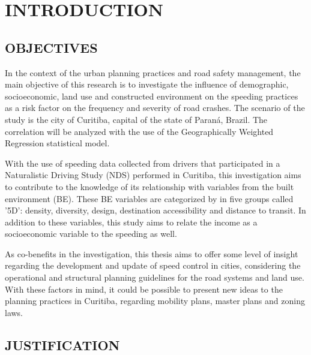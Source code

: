 

\chapter[INTRODUCTION]{INTRODUCTION}




\section{OBJECTIVES}

In the context of the urban planning practices and road safety management, the main objective of this research is to investigate the influence of demographic, socioeconomic, land use and constructed environment on the speeding practices as a risk factor on the frequency and severity of road crashes. The scenario of the study is the city of Curitiba, capital of the state of Paraná, Brazil. The correlation will be analyzed with the use of the Geographically Weighted Regression statistical model.

With the use of speeding data collected from drivers that participated in a Naturalistic Driving Study (NDS) performed in Curitiba, this investigation aims to contribute to the knowledge of its relationship with variables from the built environment (BE). These BE variables are categorized by \textcite{Ewing2009} in five groups called '5D': density, diversity, design, destination accessibility and distance to transit. In addition to these variables, this study aims to relate the income as a socioeconomic variable to the speeding as well.

As co-benefits in the investigation, this thesis aims to offer some level of insight regarding the development and update of speed control in cities, considering the operational and structural planning guidelines for the road systems and land use. With these factors in mind, it could be possible to present new ideas to the planning practices in Curitiba, regarding mobility plans, master plans and zoning laws.
    

\section{JUSTIFICATION}

